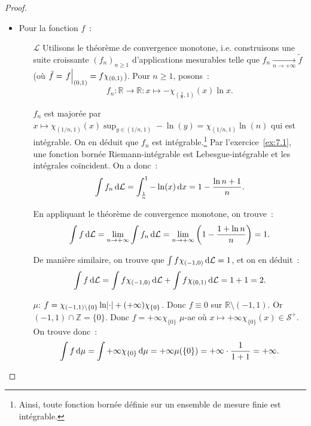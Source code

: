 \documentclass{article}
\newcommand{\restr}[2]{\left.#1\vphantom{\big|}\right|_{#2}}
\newcommand{\pinfty}{{+\infty}}
\newcommand{\Z}{{\mathbb Z}}
\newcommand{\R}{{\mathbb R}}
\begin{document}
\begin{proof}~
\begin{itemize}
	\item Pour la fonction $f$~:
	\begin{itemize}
		\item[$\mathcal L$] Utilisons le théorème de convergence monotone, i.e. construisons une suite croissante $(f_n)_{n \geq 1}$ d'applications mesurables telle que
		$f_n \xrightarrow[n \to \pinfty]{} \tilde f$ (où $\tilde f = \restr f{(0, 1)} = f\chi_{(0, 1)}$). Pour $n \geq 1$, posons~:
		\[f_n : \R \to \R : x \mapsto -\chi_{(\frac 1n, 1)}(x)\ln x.\]

		$f_n$ est majorée par $x \mapsto \chi_{(1/n, 1)}(x)\sup_{y \in (1/n, 1)}-\ln(y) = \chi_{(1/n, 1)}\ln(n)$ qui est intégrable. On en déduit que $f_n$ est intégrable.\footnote{
		Ainsi, toute fonction bornée définie sur un ensemble de mesure finie est intégrable.} Par l'exercice~\ref{ex:7.1}, une fonction bornée Riemann-intégrable est Lebesgue-intégrable et
		les intégrales coïncident. On a donc~:
		\[\int f_n\dif\mathcal L = \int_{\frac 1n}^1-\ln(x)\dif x = 1 - \frac {\ln n+1}n.\]

		En appliquant le théorème de convergence monotone, on trouve~:
		\[\int f\dif\mathcal L = \lim_{n \to \pinfty}\int f_n\dif\mathcal L = \lim_{n \to \pinfty}\left(1 - \frac {1+\ln n}n\right) = 1.\]

		De manière similaire, on trouve que $\int f\chi_{(-1, 0)}\dif\mathcal L = 1$, et on en déduit~:
		\[\int f\dif\mathcal L = \int f\chi_{(-1, 0)}\dif\mathcal L + \int f\chi_{(0, 1)}\dif\mathcal L = 1+1 = 2.\]
		\item[$\mu$:]       $f = \chi_{(-1, 1) \setminus \{0\}}\ln\abs \cdot + (\pinfty)\chi_{\{0\}}$. Donc $f \equiv 0$ sur $\R \setminus (-1, 1)$. Or $(-1, 1) \cap \Z = \{0\}$.
		Donc $f = \pinfty\chi_{\{0\}}$ $\mu$-ae où $x \mapsto \pinfty\chi_{\{0\}}(x) \in \mathcal S^+$. On trouve donc~:
		\[\int f\dif\mu = \int \pinfty\chi_{\{0\}}\dif\mu = \pinfty\mu(\{0\}) = \pinfty \cdot \frac 1{1+1} = \pinfty.\]


\end{itemize}
\end{itemize}
\end{proof}
\end{document}
